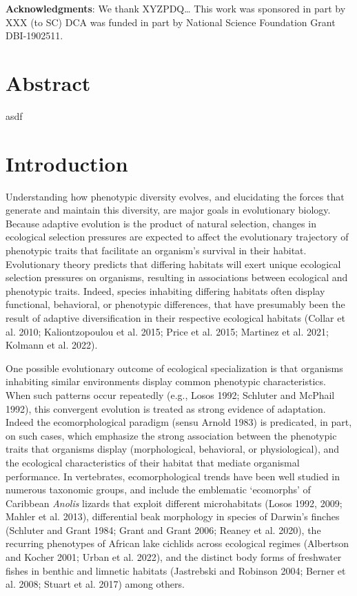 \documentclass[
  11pt,
]{article}
\begin{document}
\textbf{Acknowledgments}: We thank XYZPDQ\ldots{} This work was
sponsored in part by XXX (to SC) DCA was funded in part by National
Science Foundation Grant DBI-1902511.

\newpage

\hypertarget{abstract}{%
\section{Abstract}\label{abstract}}

asdf

\newpage

\hypertarget{introduction}{%
\section{Introduction}\label{introduction}}

Understanding how phenotypic diversity evolves, and elucidating the
forces that generate and maintain this diversity, are major goals in
evolutionary biology. Because adaptive evolution is the product of
natural selection, changes in ecological selection pressures are
expected to affect the evolutionary trajectory of phenotypic traits that
facilitate an organism's survival in their habitat. Evolutionary theory
predicts that differing habitats will exert unique ecological selection
pressures on organisms, resulting in associations between ecological and
phenotypic traits. Indeed, species inhabiting differing habitats often
display functional, behavioral, or phenotypic differences, that have
presumably been the result of adaptive diversification in their
respective ecological habitats (Collar et al. 2010; Kaliontzopoulou et
al. 2015; Price et al. 2015; Martinez et al. 2021; Kolmann et al. 2022).
\hfill\break

One possible evolutionary outcome of ecological specialization is that
organisms inhabiting similar environments display common phenotypic
characteristics. When such patterns occur repeatedly (e.g., Losos 1992;
Schluter and McPhail 1992), this convergent evolution is treated as
strong evidence of adaptation. Indeed the ecomorphological paradigm
(sensu Arnold 1983) is predicated, in part, on such cases, which
emphasize the strong association between the phenotypic traits that
organisms display (morphological, behavioral, or physiological), and the
ecological characteristics of their habitat that mediate organismal
performance. In vertebrates, ecomorphological trends have been well
studied in numerous taxonomic groups, and include the emblematic
`ecomorphs' of Caribbean \emph{Anolis} lizards that exploit different
microhabitats (Losos 1992, 2009; Mahler et al. 2013), differential beak
morphology in species of Darwin's finches (Schluter and Grant 1984;
Grant and Grant 2006; Reaney et al. 2020), the recurring phenotypes of
African lake cichlids across ecological regimes (Albertson and Kocher
2001; Urban et al. 2022), and the distinct body forms of freshwater
fishes in benthic and limnetic habitats (Jastrebski and Robinson 2004;
Berner et al. 2008; Stuart et al. 2017) among others. \hfill\break
\end{document}
